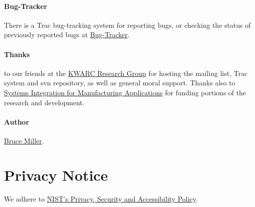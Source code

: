 \documentclass{article}
\begin{document}
\paragraph{Bug-Tracker}
  There is a Trac bug-tracking system for reporting bugs, or checking the
  status of previously reported bugs at
 \href{https://trac.mathweb.org/LaTeXML/}{Bug-Tracker}.


\paragraph{Thanks} to our friends at
the \href{http://kwarc.info}{KWARC Research Group}
for hosting the mailing list, Trac system and svn repository,
as well as general moral support.
Thanks also to \href{http://nist.gov/sima}{Systems Integration for Manufacturing Applications}
for funding portions of the research and development.

\paragraph{Author} \href{mailto:bruce.miller@nist.gov}{Bruce Miller}.
\section{Privacy Notice}\label{privacy}
We adhere to \href{http://www.nist.gov/public_affairs/privacy.htm}{NIST's Privacy, Security and Accessibility Policy}.
\end{document}
